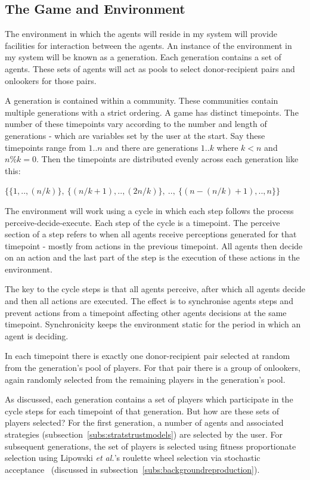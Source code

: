 \documentclass[]{final_report}
\begin{document}
\subsection{The Game and Environment}
\label{subs:env}
The environment in which the agents will reside in my system will provide facilities for interaction between the agents. An instance of the environment in my system will be known as a generation. Each generation contains a set of agents. These sets of agents will act as pools to select donor-recipient pairs and onlookers for those pairs.\par
A generation is contained within a community. These communities contain multiple generations with a strict ordering. A game has distinct timepoints. The number of these timepoints vary according to the number and length of generations - which are variables set by the user at the start. Say these timepoints range from $1..n$ and there are generations $1..k$ where $k<n$ and $n\%k=0$. Then the timepoints are distributed evenly across each generation like this: \par \centerline{$\{\{1, .., (n/k)\},\ \{(n/k+1), .., (2n/k)\},\ ..,\ \{(n-(n/k)+1), .., n\}\}$}
\par 
The environment will work using a cycle in which each step follows the process perceive-decide-execute. Each step of the cycle is a timepoint. The perceive section of a step refers to when all agents receive perceptions generated for that timepoint - mostly from actions in the previous timepoint. All agents then decide on an action and the last part of the step is the execution of these actions in the environment.\par
The key to the cycle steps is that all agents perceive, after which all agents decide and then all actions are executed. The effect is to synchronise agents steps and prevent actions from a timepoint affecting other agents decisions at the same timepoint. Synchronicity keeps the environment static for the period in which an agent is deciding.\par
In each timepoint there is exactly one donor-recipient pair selected at random from the generation's pool of players. For that pair there is a group of onlookers, again randomly selected from the remaining players in the generation's pool.\par
As discussed, each generation contains a set of players which participate in the cycle steps for each timepoint of that generation. But how are these sets of players selected? For the first generation, a number of agents and associated strategies (subsection~\ref{subs:stratstrustmodels}) are selected by the user. For subsequent generations, the set of players is selected using fitness proportionate selection using Lipowski \textit{et al.}'s roulette wheel selection via stochastic acceptance~\cite{lipowski2012roulette} (discussed in subsection~\ref{subs:backgroundreproduction}).\par
\end{document}
